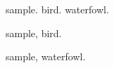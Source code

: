 \documentclass{article}
\begin{document}
\gls{sample}. \gls{bird}. \gls{waterfowl}.

\newpage

\gls{sample}, \gls{bird}.

\newpage

\gls{sample}, \gls{waterfowl}.

\printunsrtglossaries
\end{document}

